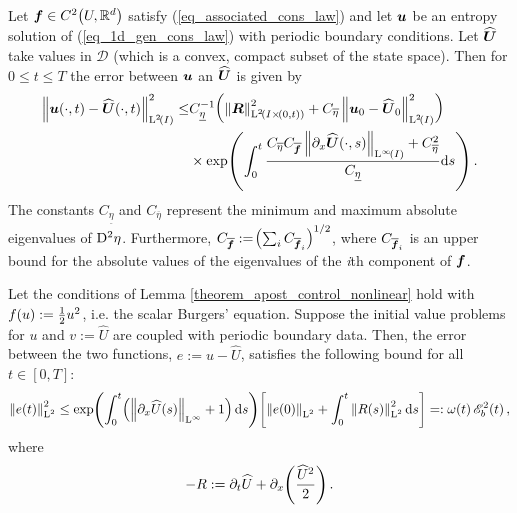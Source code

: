 \documentclass[final]{amsart}
\newcommand{\Coeta}{C_{\overline{\eta}}}
\newcommand{\Cof}{C_{\overline{\vect{f}}}}
\newcommand{\Cofi}{C_{\overline{\vect{f}}_i}}
\newcommand{\Cueta}{C_{\underline{\eta}}}
\newcommand{\recgs}[1]{\widehat{\vec{#1}}}
\renewcommand{\vect}[1]{\geovec{#1}}
\renewcommand{\vec}[1]{\geovec{#1}}
\numberwithin{equation}{section}
\begin{document}
\begin{Lem} \label{theorem_apost_control_nonlinear}Let $\vec{f}\in C^2\qp{U,\mathbb{R}^d}$ satisfy (\ref{eq_associated_cons_law}) and let $\vec{u}$ be an entropy solution of (\ref{eq_1d_gen_cons_law}) with periodic boundary conditions.  Let $\recgs{U}$ take values in $\mathcal{D}$ (which is a convex, compact subset of the state space).  Then for $0\leq t\leq T$ the error between $\vec{u}$ an  $\recgs{U}$ is given by 
\begin{equation}\label{eq_bound}
\begin{aligned}
\Norm{\vect{u}\qp{\cdot,t}-\recgs{U}\qp{\cdot,t}}^2_{\leb{2}\qp{I}}\leq&
\Cueta^{-1}\qp{\Norm{\vect{R}}^2_{\leb{2}\qp{I\times\qp{0,t}}}
  +\Coeta\Norm{\vect{u}_0-\recgs{U}_0}^2_{\leb{2}\qp{I}}}\\ &\times\exp\qp{\int_0^t\frac{\Coeta
    \Cof \Norm{\partial_x\recgs{U}\qp{\cdot,s}}_{\leb{\infty}\qp{I}}
    +\Coeta^2}{\Cueta}\mathrm{d}s}.
\end{aligned}
\end{equation}
The constants $\Cueta$ and $\Coeta$ represent the minimum and maximum absolute eigenvalues of $\mathrm{D}^2 \eta$. Furthermore, $\Cof:=\qp{\sum_i \Cofi}^{1/2}$, where $\Cofi$ is an upper bound for the absolute values of the eigenvalues of the \textit{i}th component of $\vec{f}$.
\end{Lem}

\begin{Cor}
	\label{cor_stab_control_burgers}
	Let the conditions of Lemma
        \ref{theorem_apost_control_nonlinear} hold with
        $f\!\left({u}\right):=\frac{1}{2}u^2$, i.e. the scalar Burgers'
        equation. Suppose the initial value problems for $u$ and
        $v:=\widehat{U}$ are coupled with periodic boundary data.
        Then, the error between the two functions, $e:=
        u-\widehat{U}$, satisfies the following bound for all $t\in
        [0,T]$:
	\begin{equation}\label{eq:burgers_bound}
	\Norm{e\qp{t}}^2_{\leb{2}}\leq \exp\qp{\int_0^t\qp{\Norm{\partial_x\widehat{U}\qp{s}}_{\leb{\infty}}+1}\mathrm{d}s}\qb{\Norm{e\qp{0}}_{\leb{2}}+\int_0^t\Norm{R\qp{s}}^2_{\leb{2}}\mathrm{d}s}=: \w\qp{t}\cE_b^2\qp{t},
	\end{equation}
	where 
	\begin{equation}
-R:=\partial_t\widehat{U} +\partial_x\!\left({\frac{\widehat{U}^2}{2}}\right).
	\end{equation}
\end{Cor}
\end{document}
